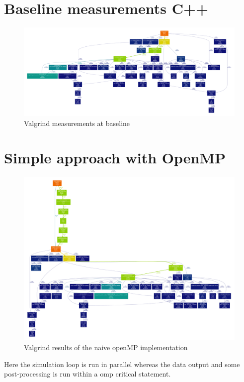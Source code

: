 
\section{Baseline measurements C++}

\begin{figure}[!htbp]
  \centering
  \includegraphics[height=0.50\textheight, angle=90]{images/profBaseLine.pdf}
  \caption{Valgrind measurements at baseline}
  \label{fig:baseline}
\end{figure}


\section{Simple approach with OpenMP}
\begin{figure}[!htbp]
  \centering
  \includegraphics[height=0.85\textheight, angle=90]{images/profOpenMPSimple.pdf}
  \caption{Valgrind results of the naive openMP implementation}
  \label{fig:naiveOpenMP}
\end{figure}

Here the simulation loop is run in parallel whereas the data output
and some post-processing is run within a omp critical statement.


